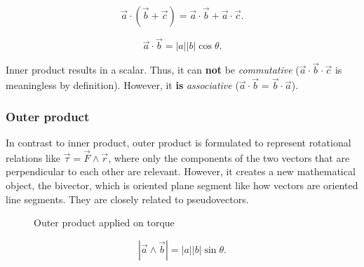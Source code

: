 \[
    \vec{a} \cdot ( \vec{b} + \vec{c} ) = \vec{a}\cdot\vec{b} + \vec{a}\cdot\vec{c}
.\]

\begin{definition}
    \[
        \vec{a} \cdot \vec{b} = |a| |b| \cos\theta
    .\]
\end{definition}

\begin{note}
    Inner product results in a scalar. Thus, it can \textbf{not} be \textit{commutative} ($\vec{a}\cdot \vec{b}\cdot \vec{c}$ is meaningless by definition). However, it \textbf{is} \textit{associative} ($\vec{a}\cdot \vec{b}=\vec{b}\cdot \vec{a}$).
\end{note}

\subsubsection{Outer product}%
\label{ssub:vector-outer-product}

In contrast to inner product, outer product is formulated to represent rotational relations like $\vec{\tau} = \vec{F} \wedge \vec{r}$, where only the components of the two vectors that are perpendicular to each other are relevant. However, it creates a new mathematical object, the bivector, which is oriented plane segment like how vectors are oriented line segments. They are closely related to pseudovectors.

\begin{figure}[htpb]
\begin{center}
\end{center}
\caption{Outer product applied on torque}%
\label{fig:torque-outer-product}
\end{figure}

\begin{definition}
    \[
        |\vec{a} \wedge \vec{b}| = |a| |b| \sin\theta
    .\]
\end{definition}

